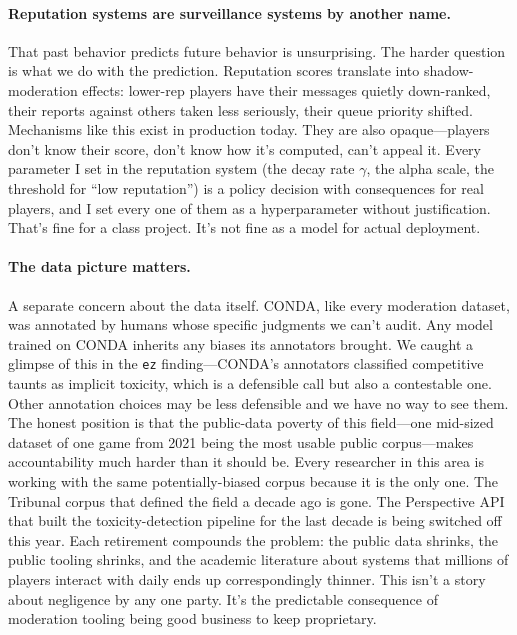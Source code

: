 \documentclass[11pt,twocolumn,letterpaper]{article}
\begin{document}
\paragraph{Reputation systems are surveillance systems by another name.}
That past behavior predicts future behavior is unsurprising. The harder question is what we do with the prediction. Reputation scores translate into shadow-moderation effects: lower-rep players have their messages quietly down-ranked, their reports against others taken less seriously, their queue priority shifted. Mechanisms like this exist in production today. They are also opaque---players don't know their score, don't know how it's computed, can't appeal it. Every parameter I set in the reputation system (the decay rate $\gamma$, the alpha scale, the threshold for ``low reputation'') is a policy decision with consequences for real players, and I set every one of them as a hyperparameter without justification. That's fine for a class project. It's not fine as a model for actual deployment.

\paragraph{The data picture matters.}
A separate concern about the data itself. CONDA, like every moderation dataset, was annotated by humans whose specific judgments we can't audit. Any model trained on CONDA inherits any biases its annotators brought. We caught a glimpse of this in the \texttt{ez} finding---CONDA's annotators classified competitive taunts as implicit toxicity, which is a defensible call but also a contestable one. Other annotation choices may be less defensible and we have no way to see them. The honest position is that the public-data poverty of this field---one mid-sized dataset of one game from 2021 being the most usable public corpus---makes accountability much harder than it should be. Every researcher in this area is working with the same potentially-biased corpus because it is the only one. The Tribunal corpus that defined the field a decade ago is gone. The Perspective API that built the toxicity-detection pipeline for the last decade is being switched off this year. Each retirement compounds the problem: the public data shrinks, the public tooling shrinks, and the academic literature about systems that millions of players interact with daily ends up correspondingly thinner. This isn't a story about negligence by any one party. It's the predictable consequence of moderation tooling being good business to keep proprietary.
\end{document}
